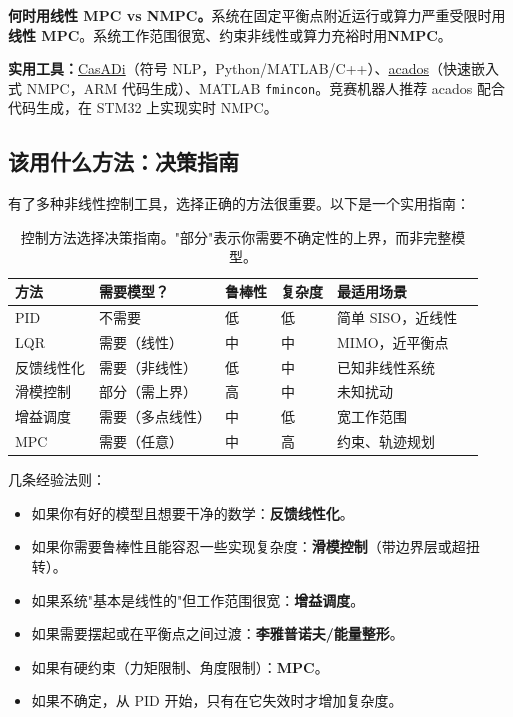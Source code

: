 \textbf{何时用线性 MPC vs NMPC。}\;系统在固定平衡点附近运行或算力严重受限时用\textbf{线性 MPC}。系统工作范围很宽、约束非线性或算力充裕时用\textbf{NMPC}。

\textbf{实用工具：}\href{https://web.casadi.org/}{CasADi}（符号 NLP，Python/MATLAB/C++）、\href{https://docs.acados.org/}{acados}（快速嵌入式 NMPC，ARM 代码生成）、MATLAB \texttt{fmincon}。竞赛机器人推荐 acados 配合代码生成，在 STM32 上实现实时 NMPC。

\subsection{该用什么方法：决策指南}

有了多种非线性控制工具，选择正确的方法很重要。以下是一个实用指南：

\begin{table}[H]
\centering
\begin{tabular}{@{}llllll@{}}
\toprule
\textbf{方法} & \textbf{需要模型？} & \textbf{鲁棒性} & \textbf{复杂度} & \textbf{最适用场景} \\
\midrule
PID & 不需要 & 低 & 低 & 简单 SISO，近线性 \\
LQR & 需要（线性） & 中 & 中 & MIMO，近平衡点 \\
反馈线性化 & 需要（非线性） & 低 & 中 & 已知非线性系统 \\
滑模控制 & 部分（需上界） & 高 & 中 & 未知扰动 \\
增益调度 & 需要（多点线性） & 中 & 低 & 宽工作范围 \\
MPC & 需要（任意） & 中 & 高 & 约束、轨迹规划 \\
\bottomrule
\end{tabular}
\caption{控制方法选择决策指南。"部分"表示你需要不确定性的上界，而非完整模型。}
\end{table}

几条经验法则：
\begin{itemize}[nosep]
    \item 如果你有好的模型且想要干净的数学：\textbf{反馈线性化}。
    \item 如果你需要鲁棒性且能容忍一些实现复杂度：\textbf{滑模控制}（带边界层或超扭转）。
    \item 如果系统"基本是线性的"但工作范围很宽：\textbf{增益调度}。
    \item 如果需要摆起或在平衡点之间过渡：\textbf{李雅普诺夫/能量整形}。
    \item 如果有硬约束（力矩限制、角度限制）：\textbf{MPC}。
    \item 如果不确定，从 PID 开始，只有在它失效时才增加复杂度。
\end{itemize}

